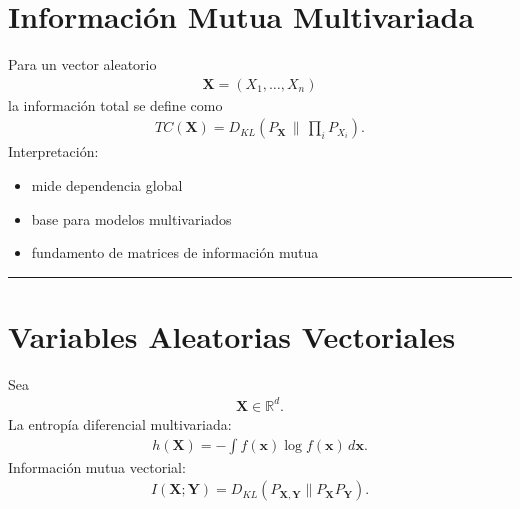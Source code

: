 \documentclass[letterpaper,10pt,english]{jupyterBook}
\begin{document}
\section{Información Mutua Multivariada}
\label{\detokenize{02_mathematical_foundations/formal_definitions:informacion-mutua-multivariada}}
\sphinxAtStartPar
Para un vector aleatorio
\begin{equation*}
\begin{split}
\mathbf{X}=(X_1,\dots,X_n)
\end{split}
\end{equation*}
\sphinxAtStartPar
la información total se define como
\begin{equation*}
\begin{split}
TC(\mathbf{X})=
D_{KL}(P_{\mathbf{X}}\,
\|\,\prod_i P_{X_i}).
\end{split}
\end{equation*}
\sphinxAtStartPar
Interpretación:
\begin{itemize}
\item {} 
\sphinxAtStartPar
mide dependencia global

\item {} 
\sphinxAtStartPar
base para modelos multivariados

\item {} 
\sphinxAtStartPar
fundamento de matrices de información mutua

\end{itemize}


\bigskip\hrule\bigskip



\section{Variables Aleatorias Vectoriales}
\label{\detokenize{02_mathematical_foundations/formal_definitions:variables-aleatorias-vectoriales}}
\sphinxAtStartPar
Sea
\begin{equation*}
\begin{split}
\mathbf{X}\in \mathbb{R}^d.
\end{split}
\end{equation*}
\sphinxAtStartPar
La entropía diferencial multivariada:
\begin{equation*}
\begin{split}
h(\mathbf{X})=-\int f(\mathbf{x})
\log f(\mathbf{x})\,d\mathbf{x}.
\end{split}
\end{equation*}
\sphinxAtStartPar
Información mutua vectorial:
\begin{equation*}
\begin{split}
I(\mathbf{X};\mathbf{Y})
=D_{KL}(P_{\mathbf{X},\mathbf{Y}}
\|P_{\mathbf{X}}P_{\mathbf{Y}}).
\end{split}
\end{equation*}
\end{document}
